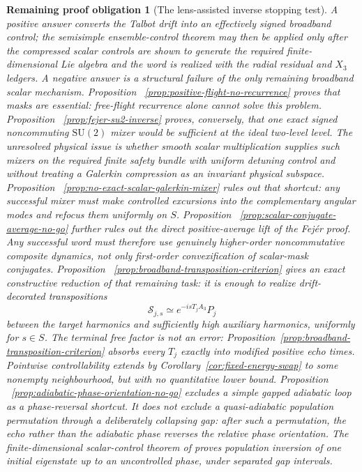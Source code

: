 \documentclass[11pt]{article}
\newtheorem{problem}[theorem]{Remaining proof obligation}
\theoremstyle{remark}
\begin{document}
\begin{problem}[The lens-assisted inverse stopping test]
A positive answer converts the Talbot drift into an effectively signed
broadband control; the semisimple ensemble-control theorem may then be applied
only after the compressed scalar controls are shown to generate the required
finite-dimensional Lie algebra and the word is realized with the radial
residual and $X_3$ ledgers.  A negative answer is a structural failure of the
only remaining broadband scalar mechanism.  Proposition
~\ref{prop:positive-flight-no-recurrence} proves that masks are essential:
free-flight recurrence alone cannot solve this problem.  Proposition
~\ref{prop:fejer-su2-inverse} proves, conversely, that one exact signed
noncommuting $\mathrm{SU}(2)$ mixer would be sufficient at the ideal
two-level level.  The unresolved physical issue is whether smooth scalar
multiplication supplies such mixers on the required finite safety bundle with
uniform detuning control and without treating a Galerkin compression as an
invariant physical subspace.  Proposition
~\ref{prop:no-exact-scalar-galerkin-mixer} rules out that shortcut: any
successful mixer must make controlled excursions into the complementary
angular modes and refocus them uniformly on $S$.  Proposition
~\ref{prop:scalar-conjugate-average-no-go} further rules out the direct
positive-average lift of the Fej\'er proof.  Any successful word must therefore
use genuinely higher-order noncommutative composite dynamics, not only
first-order convexification of scalar-mask conjugates.  Proposition
~\ref{prop:broadband-transposition-criterion} gives an exact constructive
reduction of that remaining task: it is enough to realize drift-decorated
transpositions
\[
 \mathcal S_{j,s}\simeq
 e^{-isT_jA_3}P_j
\]
between the target harmonics and sufficiently high auxiliary harmonics,
uniformly for $s\in S$.  The terminal free factor is not an error:
Proposition~\ref{prop:broadband-transposition-criterion} absorbs every
$T_j$ exactly into modified positive echo times.  Pointwise controllability
extends by Corollary~\ref{cor:fixed-energy-swap} to some nonempty
neighbourhood, but with no quantitative lower bound.  Proposition
~\ref{prop:adiabatic-phase-orientation-no-go} excludes a simple gapped
adiabatic loop as a phase-reversal shortcut.  It does not exclude a
quasi-adiabatic population permutation through a deliberately collapsing
gap: after such a permutation, the echo rather than the adiabatic phase
reverses the relative phase orientation.  The
finite-dimensional scalar-control theorem of
\cite{LiangBoscainSigalotti2026} proves population inversion of one initial
eigenstate up to an uncontrolled phase, under separated gap intervals.

\end{problem}
\end{document}
